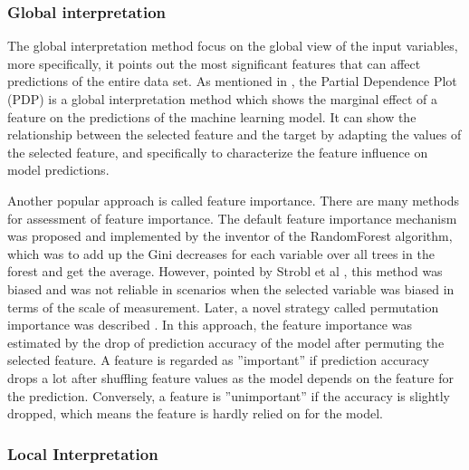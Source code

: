 \subsubsection{Global interpretation}

The global interpretation method focus on the global view of the input variables, more specifically, it points out the most significant features that can affect predictions of the entire data set. As mentioned in \cite{friedman2001greedy}, the Partial Dependence Plot (PDP) is a global interpretation method which shows the marginal effect of a feature on the predictions of the machine learning model. It can show the relationship between the selected feature and the target by adapting the values of the selected feature, and specifically to characterize the feature influence on model predictions. 

Another popular approach is called feature importance. There are many methods for assessment of feature importance. The default feature importance mechanism was proposed and implemented by the inventor of the RandomForest algorithm, which was to add up the Gini decreases for each variable over all trees in the forest and get the average. However, pointed by Strobl et al \cite{strobl2007bias}, this method was biased and was not reliable in scenarios when the selected variable was biased in terms of the scale of measurement. Later, a novel strategy called permutation importance was described \cite{fisher2018model}. In this approach, the feature importance was estimated by the drop of prediction accuracy of the model after permuting the selected feature. A feature is regarded as ”important” if prediction accuracy drops a lot after shuffling feature values as the model depends on the feature for the prediction. Conversely, a feature is ”unimportant” if the accuracy is slightly dropped, which means the feature is hardly relied on for the model.

\subsubsection{Local Interpretation}

